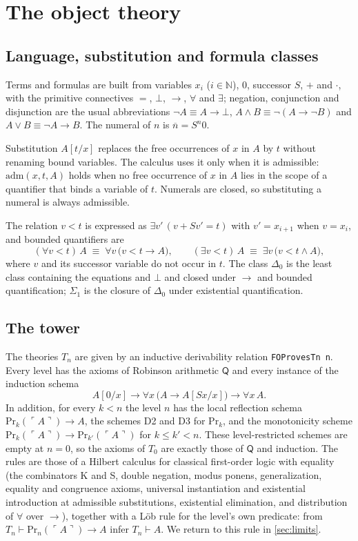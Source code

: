 \documentclass[11pt]{article}
\theoremstyle{plain}
\theoremstyle{definition}
\theoremstyle{remark}
\newcommand{\N}{\mathbb{N}}
\newcommand{\T}[1]{T_{#1}}
\newcommand{\Prv}{\mathrm{Pr}}
\newcommand{\gn}[1]{\ulcorner #1 \urcorner}
\newcommand{\num}[1]{\overline{#1}}
\newcommand{\rocq}[1]{\texttt{#1}}
\newcommand{\Ddelta}{\Delta_0}
\newcommand{\Ssigma}{\Sigma_1}
\begin{document}
\section{The object theory}\label{sec:theory}

\subsection{Language, substitution and formula classes}

Terms and formulas are built from variables $x_i$ ($i \in \N$), $0$,
successor $S$, $+$ and $\cdot$, with the primitive connectives $=$,
$\bot$, $\to$, $\forall$ and $\exists$; negation, conjunction and
disjunction are the usual abbreviations
$\neg A \equiv A \to \bot$, $A \wedge B \equiv \neg(A \to \neg B)$ and
$A \vee B \equiv \neg A \to B$.  The numeral of $n$ is
$\num{n} = S^n 0$.

Substitution $A[t/x]$ replaces the free occurrences of $x$ in $A$ by $t$
without renaming bound variables.  The calculus uses it only when it is
admissible: $\mathrm{adm}(x,t,A)$ holds when no free occurrence of $x$
in $A$ lies in the scope of a quantifier that binds a variable of $t$.
Numerals are closed, so substituting a numeral is always admissible.

The relation $v < t$ is expressed as $\exists v'\,(v + S v' = t)$ with
$v' = x_{i+1}$ when $v = x_i$, and bounded quantifiers are
\[
  (\forall v < t)\, A \;\equiv\; \forall v\,\bigl(v < t \to A\bigr),
  \qquad
  (\exists v < t)\, A \;\equiv\; \exists v\,\bigl(v < t \wedge A\bigr),
\]
where $v$ and its successor variable do not occur in $t$.  The class
$\Ddelta$ is the least class containing the equations and $\bot$ and
closed under $\to$ and bounded quantification; $\Ssigma$ is the closure
of $\Ddelta$ under existential quantification.

\subsection{The tower}

The theories $\T{n}$ are given by an inductive derivability relation
\rocq{FOProvesTn n}.  Every level has the axioms of Robinson arithmetic
$\mathsf{Q}$ and every instance of the induction schema
\[
  A[0/x] \to \forall x\,\bigl(A \to A[Sx/x]\bigr) \to \forall x\, A .
\]
In addition, for every $k < n$ the level $n$ has the local reflection
schema $\Prv_k(\gn{A}) \to A$, the schemes D2 and D3 for $\Prv_k$, and
the monotonicity scheme $\Prv_k(\gn{A}) \to \Prv_{k'}(\gn{A})$ for
$k \le k' < n$.  These level-restricted schemes are empty at $n = 0$, so
the axioms of $\T0$ are exactly those of $\mathsf{Q}$ and induction.
The rules are those of a Hilbert calculus for classical first-order
logic with equality (the combinators K and S, double negation, modus
ponens, generalization, equality and congruence axioms, universal
instantiation and existential introduction at admissible substitutions,
existential elimination, and distribution of $\forall$ over $\to$),
together with a L\"ob rule for the level's own predicate: from
$\T{n} \vdash \Prv_n(\gn{A}) \to A$ infer $\T{n} \vdash A$.  We return
to this rule in \cref{sec:limits}.
\end{document}
